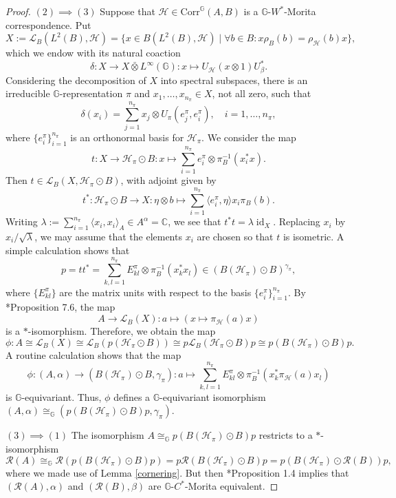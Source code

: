 \documentclass[reqno]{amsart}
\numberwithin{equation}{section}
\DeclareMathOperator{\id}{\mathrm{id}}
\newcommand{\C}{\mathbb{C}}
\newcommand{\G}{\mathbb{G}}
\newcommand{\Corr}{\mathrm{Corr}}
\newcommand{\ovot}{\bar{\otimes}}
\begin{document}
\begin{proof}
$(2)\implies (3)$ Suppose that $\mathcal{H}\in \Corr^\G(A,B)$ is a $\G$-$W^*$-Morita correspondence. Put
    $$X:= \mathscr{L}_B(L^2(B), \mathcal{H})=\{x\in B(L^2(B),\mathcal{H})\mid \forall b\in B: x\rho_B(b)= \rho_{\mathcal{H}}(b)x\},$$ which we endow with its natural coaction
    $$\delta: X \to X \ovot L^\infty(\G): x \mapsto U_\mathcal{H}(x\otimes 1)U_\beta^*.$$
Considering the decomposition of $X$ into spectral subspaces, there is an irreducible $\G$-representation $\pi$ and $x_1, \dots, x_{n_\pi}\in X$, not all zero, such that 
$$\delta(x_i) = \sum_{j=1}^{n_\pi} x_j\otimes U_\pi(e_j^\pi, e_i^\pi),\quad i=1, \dots, n_\pi,$$
 where $\{e_i^\pi\}_{i=1}^{n_\pi}$ is an orthonormal basis for $\mathcal{H}_\pi$. We consider the map
  $$t: X \to \mathcal{H}_\pi\odot B: x \mapsto \sum_{i=1}^{n_\pi} e_i^\pi\otimes \pi_B^{-1}(x_i^* x).$$
  Then $t \in \mathscr{L}_B(X, \mathcal{H}_\pi\odot B)$, with adjoint given by
  $$t^*: \mathcal{H}_\pi\odot B \to X: \eta \otimes b \mapsto \sum_{i=1}^{n_\pi} \langle e_i^\pi, \eta\rangle x_i \pi_B(b).$$
  Writing $\lambda:= \sum_{i=1}^{n_\pi}\langle x_i, x_i\rangle_A \in A^{\alpha}= \C$, we see that $t^*t = \lambda \id_X$. Replacing $x_i$ by $x_i/\sqrt{\lambda}$, we may assume that the elements $x_i$ are chosen so that $t$ is isometric. A simple calculation shows that 
  $$p= tt^*= \sum_{k,l=1}^{n_\pi} E_{kl}^\pi\otimes \pi_B^{-1}(x_k^* x_l) \in (B(\mathcal{H}_\pi)\odot B)^{\gamma_\pi},$$
  where $\{E_{kl}^\pi\}$ are the matrix units with respect to the basis $\{e_i^\pi\}_{i=1}^{n_\pi}.$ By \cite{Rie74}*{Proposition 7.6}, the map
  $$A \to \mathscr{L}_B(X): a \mapsto (x \mapsto \pi_\mathcal{H}(a)x)$$
  is a $*$-isomorphism. Therefore, we obtain the map
$$\phi: A\cong \mathscr{L}_B(X)\cong \mathscr{L}_B(p(\mathcal{H}_\pi\odot B)) \cong p \mathscr{L}_B(\mathcal{H}_\pi\odot B) p \cong p(B(\mathcal{H}_\pi)\odot B) p.$$ 
A routine calculation shows that the map $$\phi: (A, \alpha)\to (B(\mathcal{H}_\pi)\odot B, \gamma_\pi): a \mapsto \sum_{k,l=1}^{n_\pi} E_{kl}^\pi\otimes \pi_B^{-1}(x_k^* \pi_{\mathcal{H}}(a) x_l)$$
is $\G$-equivariant. Thus, $\phi$ defines a $\G$-equivariant isomorphism $(A, \alpha)\cong_\G (p(B(\mathcal{H}_\pi)\odot B)p, \gamma_\pi)$.

$(3)\implies (1)$ The isomorphism $A\cong_\G p(B(\mathcal{H}_\pi)\odot B)p$ restricts to a $*$-isomorphism
$$\mathcal{R}(A)\cong_\G \mathcal{R}(p(B(\mathcal{H}_\pi)\odot B)p)= p \mathcal{R}(B(\mathcal{H}_\pi)\odot B)p = p(B(\mathcal{H}_\pi)\odot \mathcal{R}(B))p,$$
where we made use of Lemma \ref{cornering}. But then \cite{DC12}*{Proposition 1.4} implies that $(\mathcal{R}(A), \alpha)$ and $(\mathcal{R}(B), \beta)$ are $\G$-$C^*$-Morita equivalent.\end{proof}
\end{document}
